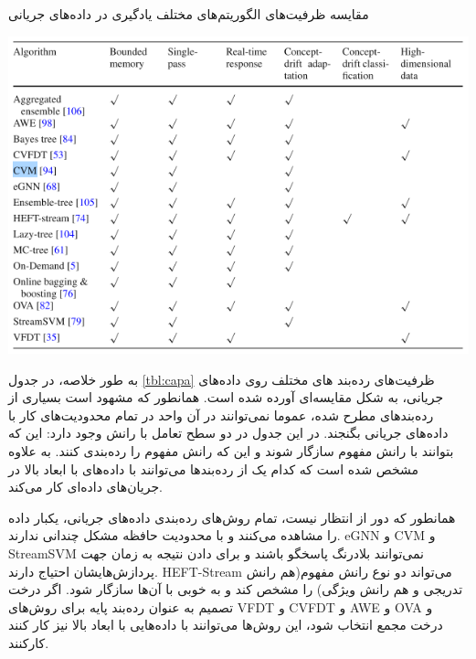 \begin{table}
  \caption{مقایسه ظرفیت‌های الگوریتم‌های مختلف یادگیری در داده‌های جریانی}
  \label{tbl:capa}
  \includegraphics[width=\linewidth]{capa}
\end{table}

به طور خلاصه، در جدول
\ref{tbl:capa}
ظرفیت‌های رده‌بند های مختلف روی داده‌های جریانی، به شکل مقایسه‌ای آورده شده است. همانطور که مشهود است بسیاری از رده‌بندهای مطرح شده، عموما نمی‌توانند در آن واحد در تمام محدودیت‌های کار با داده‌های جریانی بگنجند. در این جدول در دو سطح تعامل با رانش‌ وجود دارد: این که بتوانند با رانش مفهوم سازگار شوند و این که رانش مفهوم را رده‌بندی کنند. به علاوه مشخص شده است که کدام یک از رده‌بندها می‌توانند با داده‌های با ابعاد بالا در جریان‌های داده‌ای کار می‌کند.

همانطور که دور از انتظار نیست، تمام روش‌های رده‌بندی داده‌های جریانی، یکبار داده‌ را مشاهده می‌کنند و با محدودیت حافظه مشکل چندانی ندارند. eGNN و CVM و StreamSVM نمی‌توانند بلادرنگ پاسخگو باشند و برای دادن نتیجه به زمان جهت پردازش‌هایشان احتیاج دارند. HEFT-Stream می‌تواند دو نوع رانش‌ مفهوم(هم رانش تدریجی و هم رانش ویژگی) را مشخص کند و به خوبی با آن‌ها سازگار شود. اگر درخت تصمیم به عنوان رده‌بند پایه برای روش‌های VFDT و CVFDT و AWE و OVA و درخت مجمع انتخاب شود، این روش‌ها می‌توانند با داده‌هایی با ابعاد بالا نیز کار کنند کارکنند. 


